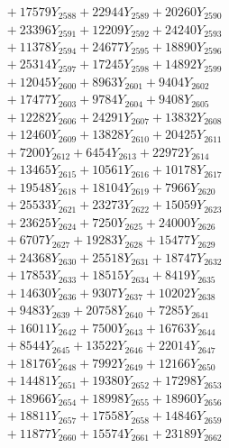 \documentclass[a4paper,10pt]{article}
\begin{document}
{\begin{align}
&\;  + 17579 Y_{2588} + 22944 Y_{2589} + 20260 Y_{2590} \\[0.3ex]
&\;  + 23396 Y_{2591} + 12209 Y_{2592} + 24240 Y_{2593} \\[0.3ex]
&\;  + 11378 Y_{2594} + 24677 Y_{2595} + 18890 Y_{2596} \\[0.3ex]
&\;  + 25314 Y_{2597} + 17245 Y_{2598} + 14892 Y_{2599} \\[0.3ex]
&\;  + 12045 Y_{2600} + 8963 Y_{2601} + 9404 Y_{2602} \\[0.3ex]
&\;  + 17477 Y_{2603} + 9784 Y_{2604} + 9408 Y_{2605} \\[0.3ex]
&\;  + 12282 Y_{2606} + 24291 Y_{2607} + 13832 Y_{2608} \\[0.5ex]\allowbreak
&\;  + 12460 Y_{2609} + 13828 Y_{2610} + 20425 Y_{2611} \\[0.3ex]
&\;  + 7200 Y_{2612} + 6454 Y_{2613} + 22972 Y_{2614} \\[0.3ex]
&\;  + 13465 Y_{2615} + 10561 Y_{2616} + 10178 Y_{2617} \\[0.3ex]
&\;  + 19548 Y_{2618} + 18104 Y_{2619} + 7966 Y_{2620} \\[0.3ex]
&\;  + 25533 Y_{2621} + 23273 Y_{2622} + 15059 Y_{2623} \\[0.3ex]
&\;  + 23625 Y_{2624} + 7250 Y_{2625} + 24000 Y_{2626} \\[0.3ex]
&\;  + 6707 Y_{2627} + 19283 Y_{2628} + 15477 Y_{2629} \\[0.3ex]
&\;  + 24368 Y_{2630} + 25518 Y_{2631} + 18747 Y_{2632} \\[0.3ex]
&\;  + 17853 Y_{2633} + 18515 Y_{2634} + 8419 Y_{2635} \\[0.3ex]
&\;  + 14630 Y_{2636} + 9307 Y_{2637} + 10202 Y_{2638} \\[0.5ex]\allowbreak
&\;  + 9483 Y_{2639} + 20758 Y_{2640} + 7285 Y_{2641} \\[0.3ex]
&\;  + 16011 Y_{2642} + 7500 Y_{2643} + 16763 Y_{2644} \\[0.3ex]
&\;  + 8544 Y_{2645} + 13522 Y_{2646} + 22014 Y_{2647} \\[0.3ex]
&\;  + 18176 Y_{2648} + 7992 Y_{2649} + 12166 Y_{2650} \\[0.3ex]
&\;  + 14481 Y_{2651} + 19380 Y_{2652} + 17298 Y_{2653} \\[0.3ex]
&\;  + 18966 Y_{2654} + 18998 Y_{2655} + 18960 Y_{2656} \\[0.3ex]
&\;  + 18811 Y_{2657} + 17558 Y_{2658} + 14846 Y_{2659} \\[0.3ex]
&\;  + 11877 Y_{2660} + 15574 Y_{2661} + 23189 Y_{2662} \\[0.3ex]

\end{align}}
\end{document}

